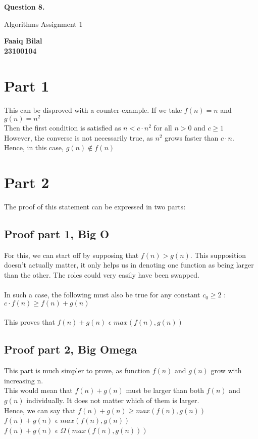 \documentclass[]{article}
\begin{document}
\begin{center}
    \vspace*{1cm}

    \textbf{Question 8.}

    \vspace{0.5cm}
     Algorithms Assignment 1

    \vspace{0.15cm}

    \textbf{Faaiq Bilal} \\ 
    \textbf{23100104}
         
\end{center}

\section{Part 1}
This can be disproved with a counter-example. If we take $ f(n) = n$ and $ g(n) = n^2$ \\ 
Then the first condition is satisfied as $ n < c \cdot n^2 $ for all $n > 0 $ and $c \geq 1$  
\\ However, the converse is not necessarily true, as $n^2$ grows faster than $c \cdot n $.
\\
Hence, in this case, $g(n) \not\in f(n) $

\section{Part 2}
The proof of this statement can be expressed in two parts:
\subsection{Proof part 1, Big O}
For this, we can start off by supposing that $f(n) > g(n)$. This supposition doesn't actually matter, it only helps us in denoting one function as being larger than the other. The roles could very easily have been swapped. 
\\ \\
In such a case, the following must also be true for any constant $c_0 \geq 2$ : \\
$ c \cdot f(n) \geq f(n) + g(n) $ 
\\ \\
This proves that $f(n) + g(n) $ $ \epsilon $ $ max(f(n), g(n)) $

\subsection{Proof part 2, Big Omega}
This part is much simpler to prove, as function $f(n)$ and $g(n)$ grow with increasing n.
\\
This would mean that $f(n) + g(n)$ must be larger than both $f(n)$ and $g(n)$ individually. It does not matter which of them is larger.
\\
Hence, we can say that $f(n) + g(n) \geq max(f(n),g(n))$
\\
$f(n) + g(n) $ $ \epsilon$ $ max(f(n), g(n)) $ \\
$f(n) + g(n) $ $ \epsilon$ $ \Omega (max(f(n), g(n)))  $
\\
\end{document}
